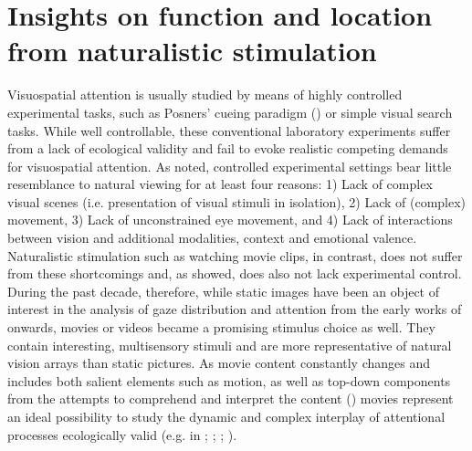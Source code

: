 \documentclass[a4paper, 12pt]{scrreprt}
\begin{document}
\section{Insights on function and location from naturalistic stimulation}\label{section:shortcomings}
Visuospatial attention is usually studied by means of highly controlled experimental tasks, such as Posners' cueing paradigm (\cite{posner1980attention}) or simple visual search tasks. While well controllable, these conventional laboratory experiments suffer from a lack of ecological validity and fail to evoke realistic competing demands for visuospatial attention. As \textcite{hasson2004intersubject} noted, controlled experimental settings bear little resemblance to natural viewing for at least four reasons: 1) Lack of complex visual scenes (i.e. presentation of visual stimuli in isolation), 2) Lack of (complex) movement, 3) Lack of unconstrained eye movement, and 4) Lack of interactions between vision and additional modalities, context and emotional valence. Naturalistic stimulation such as watching movie clips, in contrast, does not suffer from these shortcomings and, as \textcite{hasson2010reliability} showed, does also not lack experimental control. During the past decade, therefore, while static images have been an object of interest in the analysis of gaze distribution and attention from the early works of \textcite{yarbus1967eye} onwards, movies or videos became a promising stimulus choice as well. They contain interesting, multisensory stimuli and are more representative of natural vision arrays than static pictures. As movie content constantly changes and includes both salient elements such as motion, as well as top-down components from the attempts to comprehend and interpret the content (\cite{ross2013eye}) movies represent an ideal possibility to study the dynamic and complex interplay of attentional processes ecologically valid   (e.g. in \textcite{hasson2004intersubject}; \cite{carmi2006visual}; \cite{tseng2009quantifying}; \cite{dorr2010variability}). \newline
\end{document}

